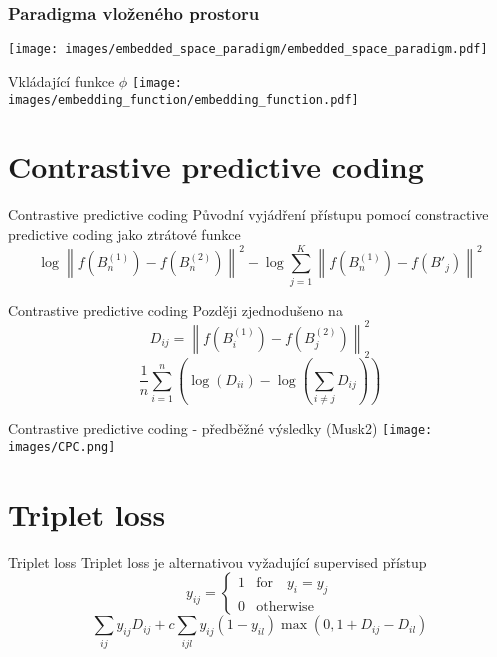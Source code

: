\documentclass[10pt]{beamer}
\begin{document}
\begin{frame}[c]\frametitle{Paradigma vloženého prostoru}
	\centering
	\texttt{[image: images/embedded\_space\_paradigm/embedded\_space\_paradigm.pdf]}
\end{frame}

\begin{frame}{Vkládající funkce \( \phi \)}
	\centering
	\texttt{[image: images/embedding\_function/embedding\_function.pdf]}
\end{frame}

\section{Contrastive predictive coding}

\begin{frame}{Contrastive predictive coding}
	Původní vyjádření přístupu pomocí constractive predictive coding jako ztrátové funkce
	\[ \log \left\lVert f \left( B_n^{(1)} \right) - f \left( B_n^{(2)} \right) \right\rVert^2 - \log \sum_{j = 1}^K \left\lVert f \left( B_n^{(1)} \right) - f \left( B'_j \right) \right\rVert^2 \]
\end{frame}

\begin{frame}{Contrastive predictive coding}
	Později zjednodušeno na
	\[ D_{ij} = \left\lVert f \left( B_i^{(1)} \right) - f \left( B_j^{(2)} \right) \right\rVert_2^2 \]
	\[ \frac{1}{n} \sum_{i = 1}^n \left( \log \left( D_{ii} \right) - \log \left( \sum_{i \neq j} D_{ij} \right) \right) \]
\end{frame}

\begin{frame}{Contrastive predictive coding - předběžné výsledky (Musk2)}
	\centering
	\texttt{[image: images/CPC.png]}
\end{frame}

\section{Triplet loss}

\begin{frame}{Triplet loss}
	Triplet loss je alternativou vyžadující supervised přístup
	\[ y_{ij} =
\begin{cases}
	1 &\text{for} \quad y_i = y_j \\
	0 &\text{otherwise}
\end{cases}
\]
\[ \sum_{ij} y_{ij} D_{ij} + c \sum_{ijl} y_{ij} \left( 1 - y_{il} \right) \max \left( 0, 1 + D_{ij} - D_{il} \right) \]
\end{frame}
\end{document}
